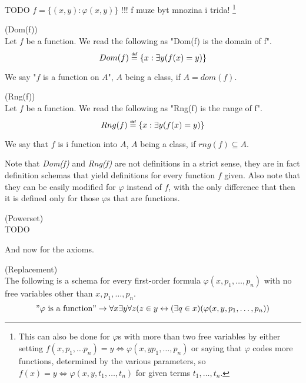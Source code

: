 TODO $f = \{(x, y) : \varphi(x, y)\}$ !!! f muze byt mnozina i trida!
\footnote{This can also be done for $\varphi$s with more than two free variables by either setting $f(x, p_1, \ldots p_n) = y \iff \varphi(x, y p_1, \ldots, p_n)$ or saying that $\varphi$ codes more functions, determined by the various parameters, so $f(x) = y \iff \varphi(x, y, t_1, \ldots, t_n)$ for given terms $t_1, \ldots, t_n$.}

\begin{definition}{(Dom(f))}\label{def:dom}\\
Let $f$ be a function. We read the following as "Dom(f) is the domain of f".
\begin{equation}
Dom(f) \defeq \{x : \exists y (f(x) = y)\}
\end{equation}
\end{definition}
We say "$f$ is a function on $A$", $A$ being a class, if $A = dom(f)$.

\begin{definition}{(Rng(f))}\label{def:rng}\\
Let $f$ be a function. We read the following as "Rng(f) is the range of f".
\begin{equation}
Rng(f) \defeq \{x : \exists y (f(x) = y)\}
\end{equation}
\end{definition}
We say that $f$ is i function into $A$, $A$ being a class, if $rng(f) \subseteq A$.

Note that \emph{Dom(f)} and \emph{Rng(f)} are not definitions in a strict sense, they are in fact definition schemas that yield definitions for every function $f$ given. Also note that they can be easily modified for $\varphi$ instead of $f$, with the only difference that then it is defined only for those $\varphi$s that are functions.

\begin{definition}{(Powerset)}\\
TODO
\end{definition}

And now for the axioms.
\begin{definition}{(Replacement)}\label{def:replacement}\\
The following is a schema for every first-order formula $\varphi(x, p_1, \ldots, p_n)$ with no free variables other than $x, p_1, \ldots, p_n$.
\begin{equation}
"\varphi\mbox{ is a function}"\rightarrow \forall x \exists y \forall z (z \in y \leftrightarrow (\exists q \in x)(\varphi(x, y, p_1, \ldots, p_n))
\end{equation}
\end{definition}


